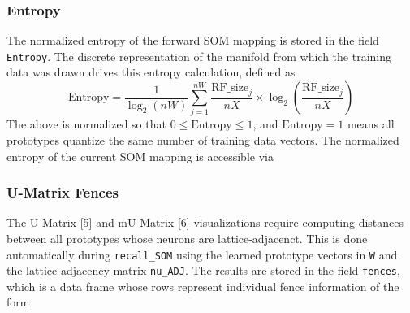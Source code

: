 \documentclass[]{article}
\newenvironment{Shaded}{\begin{snugshade}}{\end{snugshade}}
\newcommand{\CommentTok}[1]{\textcolor[rgb]{0.56,0.35,0.01}{\textit{#1}}}
\newcommand{\KeywordTok}[1]{\textcolor[rgb]{0.13,0.29,0.53}{\textbf{#1}}}
\newcommand{\NormalTok}[1]{#1}
\newcommand{\OperatorTok}[1]{\textcolor[rgb]{0.81,0.36,0.00}{\textbf{#1}}}
\begin{document}
\hypertarget{entropy}{%
\subsubsection{Entropy}\label{entropy}}

The normalized entropy of the forward SOM mapping is stored in the field \texttt{Entropy}. The discrete representation of the manifold from which the training data was drawn drives this entropy calculation, defined as
\[ \text{Entropy} = \frac{1}{\log_2(nW)} \sum\limits_{j=1}^{nW} \frac{\text{RF\_size}_j}{nX} \times \log_2\left( \frac{\text{RF\_size}_j}{nX} \right)\]
The above is normalized so that \(0 \leq \text{Entropy} \leq 1\), and \(\text{Entropy} = 1\) means all prototypes quantize the same number of training data vectors. The normalized entropy of the current SOM mapping is accessible via

\begin{Shaded}
\end{Shaded}

\hypertarget{u-matrix-fences}{%
\subsubsection{U-Matrix Fences}\label{u-matrix-fences}}

The U-Matrix {[}\protect\hyperlink{ref-UMatrix}{5}{]} and mU-Matrix {[}\protect\hyperlink{ref-MerenyiJainVillmann}{6}{]} visualizations require computing distances between all prototypes whose neurons are lattice-adjacenct. This is done automatically during \texttt{recall\_SOM} using the learned prototype vectors in \texttt{W} and the lattice adjacency matrix \texttt{nu\_ADJ}. The results are stored in the field \texttt{fences}, which is a data frame whose rows represent individual fence information of the form

\begin{Shaded}
\end{Shaded}
\end{document}
